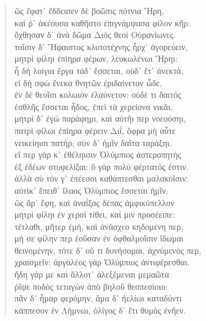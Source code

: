 \begin{Spacing}{1.5}
\begin{verse}
{\large\g ὣς ἔφατ᾽ ἔδδεισεν δὲ βοῶπις πότνια Ἥρη,  } \\
{\large\g καί ῥ᾽ ἀκέουσα καθῆστο ἐπιγνάμψασα φίλον κῆρ:  } \\
{\large\g ὄχθησαν δ᾽ ἀνὰ δῶμα Διὸς θεοὶ Οὐρανίωνες.  } \\
{\large\g τοῖσιν δ᾽ Ἥφαιστος κλυτοτέχνης ἦρχ᾽ ἀγορεύειν,  } \\
{\large\g μητρὶ φίληι ἐπίηρα φέρων, λευκωλένωι Ἥρηι:  } \\
{\large\g ἦ δὴ λοίγια ἔργα τάδ᾽ ἔσσεται, οὐδ᾽ ἔτ᾽ ἀνεκτά,  } \\
{\large\g εἰ δὴ σφὼ ἕνεκα θνητῶν ἐριδαίνετον ὧδε,  } \\
{\large\g ἐν δὲ θεοῖσι κολωιὸν ἐλαύνετον: οὐδέ τι δαιτός  } \\
{\large\g ἐσθλῆς ἔσσεται ἦδος, ἐπεὶ τὰ χερείονα νικᾶι.  } \\
{\large\g μητρὶ δ᾽ ἐγὼ παράφημι, καὶ αὐτῆι περ νοεούσηι,  } \\
{\large\g πατρὶ φίλωι ἐπίηρα φέρειν Διΐ, ὄφρα μὴ αὖτε  } \\
{\large\g νεικείηισι πατήρ, σὺν δ᾽ ἡμῖν δαῖτα ταράξηι.  } \\
{\large\g εἴ περ γάρ κ᾽ ἐθέληισιν Ὀλύμπιος ἀστεροπητής  } \\
{\large\g ἐξ ἑδέων στυφελίξαι: ὃ γὰρ πολὺ φέρτατός ἐστιν.  } \\
{\large\g ἀλλὰ σὺ τόν γ᾽ ἐπέεσσι καθάπτεσθαι μαλακοῖσιν:  } \\
{\large\g αὐτίκ᾽ ἔπειθ᾽ ἵλαος Ὀλύμπιος ἔσσεται ἡμῖν.  } \\
{\large\g ὣς ἄρ᾽ ἔφη, καὶ ἀναΐξας δέπας ἀμφικύπελλον  } \\
{\large\g μητρὶ φίληι ἐν χερσὶ τίθει, καί μιν προσέειπε:  } \\
{\large\g τέτλαθι, μῆτερ ἐμή, καὶ ἀνάσχεο κηδομένη περ,  } \\
{\large\g μή σε φίλην περ ἐοῦσαν ἐν ὀφθαλμοῖσιν ἴδωμαι  } \\
{\large\g θεινομένην, τότε δ᾽ οὔ τι δυνήσομαι, ἀχνύμενός περ,  } \\
{\large\g χραισμεῖν: ἀργαλέος γὰρ Ὀλύμπιος ἀντιφέρεσθαι.  } \\
{\large\g ἤδη γάρ με καὶ ἄλλοτ᾽ ἀλεξέμεναι μεμαῶτα  } \\
{\large\g ῥῖψε ποδὸς τεταγὼν ἀπὸ βηλοῦ θεσπεσίοιο:  } \\
{\large\g πᾶν δ᾽ ἦμαρ φερόμην, ἅμα δ᾽ ἠελίωι καταδύντι  } \\
{\large\g κάππεσον ἐν Λήμνωι, ὀλίγος δ᾽ ἔτι θυμὸς ἐνῆεν.  } \\

\end{verse}
\end{Spacing}

